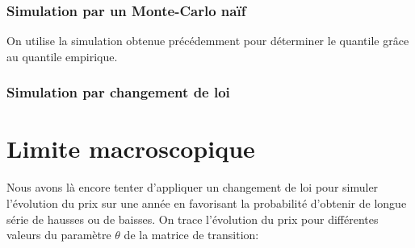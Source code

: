 \documentclass[a4paper,11pt]{article}
\begin{document}
\subsubsection{Simulation par un Monte-Carlo naïf}
On utilise la simulation obtenue précédemment pour déterminer le quantile grâce au quantile empirique.

\subsubsection{Simulation par changement de loi}

\section{Limite macroscopique}

Nous avons là encore tenter d'appliquer un changement de loi pour simuler l'évolution du prix sur une année en favorisant la probabilité d'obtenir de longue série de hausses ou de baisses. 
On trace l'évolution du prix pour différentes valeurs du paramètre $\theta$ de la matrice de transition:
\end{document}
